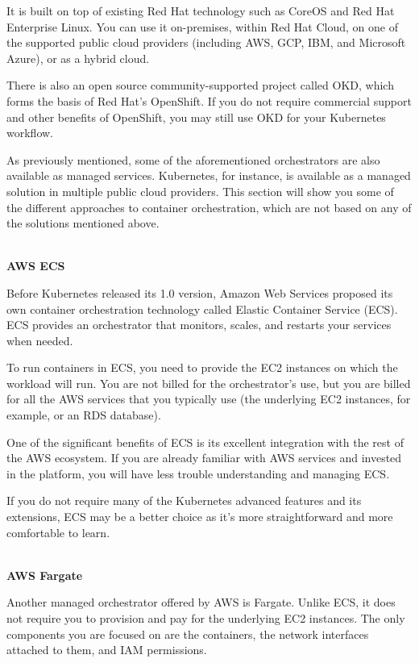 It is built on top of existing Red Hat technology such as CoreOS and Red Hat Enterprise Linux. You can use it on-premises, within Red Hat Cloud, on one of the supported public cloud providers (including AWS, GCP, IBM, and Microsoft Azure), or as a hybrid cloud. 

There is also an open source community-supported project called OKD, which forms the basis of Red Hat's OpenShift. If you do not require commercial support and other benefits of OpenShift, you may still use OKD for your Kubernetes workflow.


As previously mentioned, some of the aforementioned orchestrators are also available as managed services. Kubernetes, for instance, is available as a managed solution in multiple public cloud providers. This section will show you some of the different approaches to container orchestration, which are not based on any of the solutions mentioned above.

\hspace*{\fill} \\ %
\noindent
\textbf{AWS ECS}

Before Kubernetes released its 1.0 version, Amazon Web Services proposed its own container orchestration technology called Elastic Container Service (ECS). ECS provides an orchestrator that monitors, scales, and restarts your services when needed.

To run containers in ECS, you need to provide the EC2 instances on which the workload will run. You are not billed for the orchestrator's use, but you are billed for all the AWS services that you typically use (the underlying EC2 instances, for example, or an RDS database).

One of the significant benefits of ECS is its excellent integration with the rest of the AWS ecosystem. If you are already familiar with AWS services and invested in the platform, you will have less trouble understanding and managing ECS.

If you do not require many of the Kubernetes advanced features and its extensions, ECS may be a better choice as it's more straightforward and more comfortable to learn.

\hspace*{\fill} \\ %
\noindent
\textbf{AWS Fargate}

Another managed orchestrator offered by AWS is Fargate. Unlike ECS, it does not require you to provision and pay for the underlying EC2 instances. The only components you are focused on are the containers, the network interfaces attached to them, and IAM permissions.


